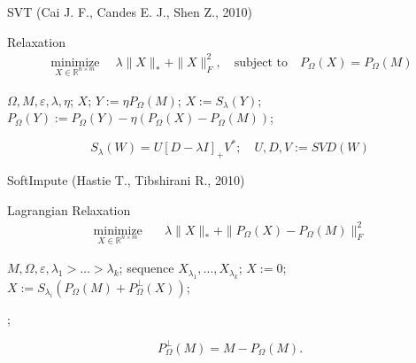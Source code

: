 \documentclass{beamer}
\begin{document}
\begin{frame}{SVT (Cai J. F., Candes E. J., Shen Z., 2010)}
		\begin{block}{Relaxation}
			\vspace{-0.5cm}
			\begin{align*}
			\mathop{\text{minimize}}\limits_{X \in \mathbb{R}^{n \times m}} \quad \lambda \| X \|_* + \| X \|_F^2, \quad
			\text{subject to} \quad P_{\Omega} (X) = P_{\Omega} (M)
			\end{align*}
		\end{block}
	\vspace{0.3cm}
	\begin{algorithmic}[1]
		\REQUIRE $\Omega, M, \varepsilon, \lambda, \eta$;
		\ENSURE $X$;
		\STATE $Y := \eta P_{\Omega}(M)$;
		\REPEAT
		\STATE $X := S_{\lambda} (Y)$;
		\STATE $P_{\Omega}\left(Y\right) := P_{\Omega}\left(Y\right) - \eta \left(P_\Omega (X) - P_\Omega(M)\right)$;
	\end{algorithmic}
	\vspace{0.3cm}
$$
S_{\lambda} (W) = U [D - \lambda I]_+ V^*; \quad U, D, V := SVD(W)
$$
\end{frame}
\begin{frame}{SoftImpute (Hastie T., Tibshirani R., 2010)}
		\begin{block}{Lagrangian Relaxation}
			\vspace{-0.5cm}
			\begin{align*}
			\mathop{\text{minimize}}\limits_{X \in \mathbb{R}^{n \times m}} \quad & 
			\lambda \| X \|_* + \|P_\Omega(X) - P_\Omega(M) \|_F^2
			\end{align*}
		\end{block}

\begin{algorithmic}[1]
	\REQUIRE $M, \Omega, \varepsilon, \lambda_1 > \dots > \lambda_k$;
	\ENSURE sequence $X_{\lambda_1}, \dots, X_{\lambda_k}$;
	\STATE $X := 0$;
	\REPEAT
	\STATE $X := S_{\lambda_i} (P_\Omega(M) + P_\Omega^\bot (X))$;
	
	;
	\ENDFOR
\end{algorithmic}
$$
	P_{\Omega}^\bot (M) = M - P_{\Omega} (M).
$$
\end{frame}
\end{document}
